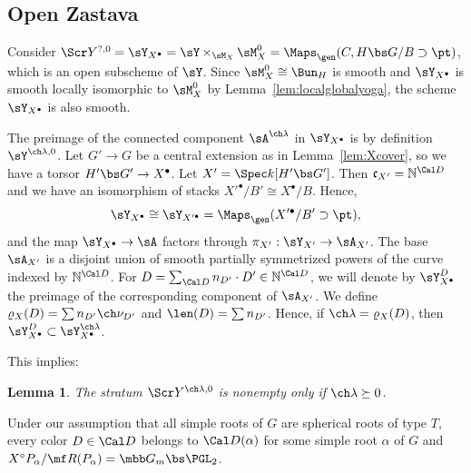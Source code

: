 \documentclass[final]{amsart}
\newtheorem{lem}[subsubsection]{Lemma}
\theoremstyle{remark}
\theoremstyle{definition}
\DeclareMathOperator*{\xt}{\times}
\numberwithin{equation}{section}
\begin{document}
\subsection{Open Zastava} \label{sect:Y0cc}
Consider $\Scr Y^{?,0} = \sY_{X^\bullet}=\sY \xt_{\sM_X} \sM_X^0 = \Maps_\gen(C, H\bs G/B \supset \pt)$, which 
is an open subscheme of $\sY$. 
Since $\sM_X^0 \cong \Bun_H$ is smooth and $\sY_{X^\bullet}$ is smooth locally isomorphic to 
$\sM_X^0$ by Lemma~\ref{lem:localglobalyoga}, the scheme $\sY_{X^\bullet}$ is also smooth. 

The preimage of the connected component $\sA^{\ch\lambda}$ in $\sY_{X^\bullet}$ 
is by definition $\sY^{\ch\lambda,0}$. 
Let $G' \to G$ be a central extension as in Lemma~\ref{lem:Xcover}, so 
we have a torsor $H'\bs G' \to X^\bullet$. 
Let $X' = \Spec k[H'\bs G']$. 
Then $\mathfrak c_{X'} = \mathbb N^{\Cal D}$ and we have an isomorphism of stacks
$X'^\bullet / B' \cong  X^\bullet/ B$.
Hence, 
\begin{equation}\label{e:YXprime}
    \sY_{X^\bullet} \cong \sY_{X'^\bullet} = \Maps_\gen( X'^\bullet/B' \supset \pt ),
\end{equation}
and the map $\sY_{X^\bullet} \to \sA$ factors through $\pi_{X'} : \sY_{X'} \to \sA_{X'}$.
The base $\sA_{X'}$ is a disjoint union of smooth partially symmetrized powers of the curve indexed by $\mathbb N^{\Cal D}$. 
 For $D = \sum_{\Cal D} n_{D'}\cdot D'\in \mathbb N^{\Cal D}$, we will denote by 
$\sY_{X^\bullet}^D$ the preimage of the corresponding component of $\sA_{X'}$. 
We define $\varrho_X(D) = \sum n_{D'}\ch\nu_{D'}$ and $\len(D) = \sum n_{D'}$. Hence, if $\ch\lambda = \varrho_X(D)$, then $\sY_{X^\bullet}^D \subset \sY_{X^\bullet}^{\ch\lambda}$. 

This implies: 

\begin{lem} \label{lem:Ynonempty}
The stratum $\Scr Y^{\ch\lambda,0}$ is nonempty only if $\ch\lambda \succeq 0$.
\end{lem}



Under our assumption that all simple roots of $G$ are spherical roots of type $T$, 
every color $D\in \Cal D$ belongs to $\Cal D(\alpha)$ for some simple root $\alpha$ of $G$
and $X^\circ P_\alpha/\mf R(P_\alpha) = \mbb G_m \bs \PGL_2$. 
\end{document}
